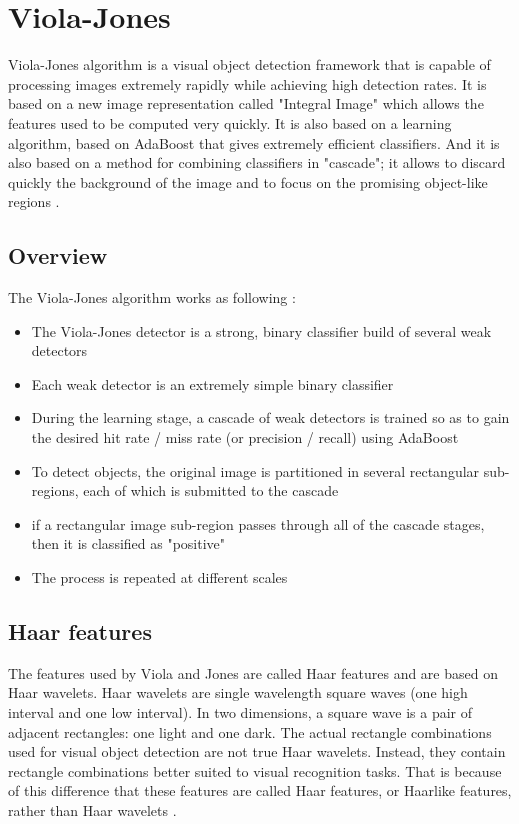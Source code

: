 \chapter{Viola-Jones}

\noindent Viola-Jones algorithm is a visual object detection framework that is capable of processing images extremely rapidly while achieving high detection rates. It is based on a new image representation called "Integral Image" which allows the features used to be computed very quickly. It is also based on a learning algorithm, based on AdaBoost that gives extremely efficient classifiers. And it is also based on a method for combining classifiers in "cascade"; it allows to discard quickly the background of the image and to focus on the promising object-like regions \cite{VIO01}.
\newline

\section{Overview}

\vspace{\baselineskip}
\noindent The Viola-Jones algorithm works as following \cite{DIN08}:

\begin{itemize}
  \item The Viola-Jones detector is a strong, binary classifier build of several weak detectors
  \item Each weak detector is an extremely simple binary classifier
  \item During the learning stage, a cascade of weak detectors is trained so as to gain the desired hit rate / miss rate (or precision / recall) using AdaBoost
  \item To detect objects, the original image is partitioned in several rectangular sub-regions, each of which is submitted to the cascade
  \item if a rectangular image sub-region passes through all of the cascade stages, then it is classified as "positive"
  \item The process is repeated at different scales
\end{itemize}

\section{Haar features}

\vspace{\baselineskip}
\noindent The features used by Viola and Jones are called Haar features and are based on Haar wavelets. Haar wavelets are single wavelength square waves (one high interval and one low interval). In two dimensions, a square wave is a pair of adjacent rectangles: one light and one dark. The actual rectangle combinations used for visual object detection are not true Haar wavelets. Instead, they contain rectangle combinations better suited to visual recognition tasks. That is because of this difference that these features are called Haar features, or Haarlike features, rather than Haar wavelets \cite{HEW07}.
\newline

